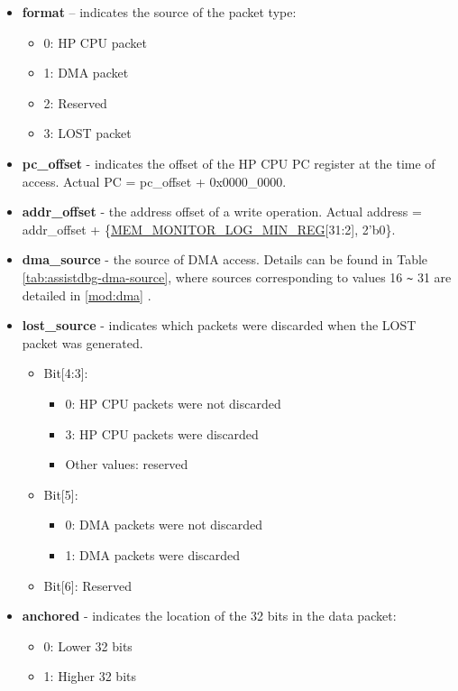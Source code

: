 \documentclass[main\_\_EN.tex]{subfiles}
\begin{document}
\begin{itemize}
    \item \textbf{format} – indicates the source of the packet type:
    \begin{itemize}
        \item 0: HP CPU packet
        \item 1: DMA packet
        \item 2: Reserved
        \item 3: LOST packet
    \end{itemize}
    \item \textbf{pc\_offset} - indicates the offset of the HP CPU PC register at the time of access. Actual PC = pc\_offset + 0x0000\_0000.
    \item \textbf{addr\_offset} - the address offset of a write operation. Actual address = addr\_offset + \{\hyperref[regdesc:MEMMONITORLOGMINREG]{MEM\_MONITOR\_LOG\_MIN\_REG}[31:2], 2'b0\}.
    \item \textbf{dma\_source} - the source of DMA access. Details can be found in Table \ref{tab:assistdbg-dma-source}, where sources corresponding to values 16 \verb+~+ 31 are detailed in \ref{mod:dma} \textit{}.
    \item \textbf{lost\_source} - indicates which packets were discarded when the LOST packet was generated.
    \begin{itemize}
        \item Bit[4:3]:
        \begin{itemize}
            \item 0: HP CPU packets were not discarded
            \item 3: HP CPU packets were discarded
            \item Other values: reserved
        \end{itemize}
        \item Bit[5]:
        \begin{itemize}
            \item 0: DMA packets were not discarded
            \item 1: DMA packets were discarded
        \end{itemize}
        \item Bit[6]: Reserved
    \end{itemize}
    \item \textbf{anchored} - indicates the location of the 32 bits in the data packet:
    \begin{itemize}
        \item 0: Lower 32 bits
        \item 1: Higher 32 bits
    \end{itemize}
\end{itemize}
\end{document}
